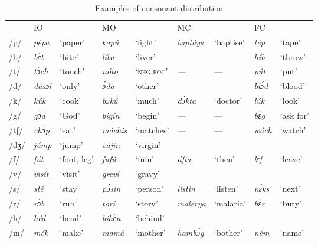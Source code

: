 \begin{sidewaystable}
\caption{Examples of consonant distribution}
\label{tab:key:2.6}

\begin{tabularx}{\textwidth}{l lX lX lX lX}
 & \MakeUppercase{io} &  & MO &  & \MakeUppercase{mc} &  & \MakeUppercase{fc} & \\
\lsptoprule
/p/ & \itshape pépa & ‘paper’ & \itshape kapú & ‘fight’ & \itshape baptáys & ‘baptise’ & \itshape tép & ‘tape’\\
/b/ & \itshape bɛ́t & ‘bite’ & \itshape líba & ‘liver’ & \itshape {}--- & {}--- & \itshape híb & ‘throw’\\
/t/ & \itshape tɔ́ch & ‘touch’ & \itshape nóto & ‘\textsc{neg}.\textsc{foc}’ & \itshape {}--- & {}--- & \itshape pút & ‘put’\\
/d/ & \itshape dásɔl & ‘only’ & \itshape ɔ́da & ‘other’ & \itshape {}--- & {}--- & \itshape blɔ́d & ‘blood’\\
/k/ & \itshape kúk & ‘cook’ & \itshape bɔkú & ‘much’ & \itshape dɔ́kta & ‘doctor’ & \itshape lúk & ‘look’\\
/g/ & \itshape gɔ́d & ‘God’ & \itshape bigín & ‘begin’ & \itshape {}--- & {}--- & \itshape bɛ́g & ‘ask for’\\
/tʃ/ & \itshape chɔ́p & ‘eat’ & \itshape máchis & ‘matches’ & \itshape {}--- & {}--- & \itshape wách & ‘watch’\\
/dʒ/ & \itshape júmp & ‘jump’ & \itshape vájin & ‘virgin’ & \itshape {}--- & {}--- & \itshape {}--- & \textit{{}---}\\
/f/ & \itshape fút & ‘foot, leg’ & \itshape fufú & ‘fufu’ & \itshape áfta & ‘then’ & \itshape lɛ́f & ‘leave’\\
/v/ & \itshape visít & ‘visit’ & \itshape greví & ‘gravy’ & \itshape {}--- & {}--- & \itshape \textup{{}---} & \textit{{}---}\\
/s/ & \itshape sté & ‘stay’ & \itshape pɔ́sin & ‘person’ & \itshape lístin & ‘listen’ & \itshape nɛ́ks & ‘next’\\
/r/ & \itshape rɔ́b & ‘rub’ & \itshape torí & ‘story’ & \itshape malérya & ‘malaria’ & \itshape bɛ́r & ‘bury’\\
/h/ & \itshape héd & ‘head’ & \itshape bihɛ́n & ‘behind’ & \itshape {}--- & {}--- & \itshape {}--- & {}---\\
/m/ & \itshape mék & ‘make’ & \itshape mamá & ‘mother’ & \itshape hambɔ́g & ‘bother’ & \itshape ném & ‘name’\\

\end{tabularx}
\end{sidewaystable}
